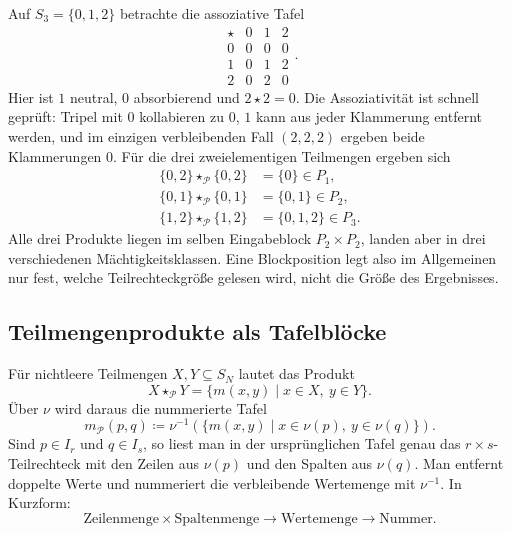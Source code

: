 \documentclass[main.tex]{subfiles}
\begin{document}
\begin{example}
Auf \(S_3=\{0,1,2\}\) betrachte die assoziative Tafel
\[
\begin{array}{c|ccc}
\star&0&1&2\\\hline
0&0&0&0\\
1&0&1&2\\
2&0&2&0
\end{array}.
\]
Hier ist \(1\) neutral, \(0\) absorbierend und \(2\star2=0\).  Die
Assoziativität ist schnell geprüft: Tripel mit \(0\) kollabieren zu \(0\),
\(1\) kann aus jeder Klammerung entfernt werden, und im einzigen verbleibenden
Fall \((2,2,2)\) ergeben beide Klammerungen \(0\).  Für die drei
zweielementigen Teilmengen ergeben sich
\[
\begin{aligned}
  \{0,2\}\star_{\mathcal P}\{0,2\}&=\{0\}\in P_1,\\
  \{0,1\}\star_{\mathcal P}\{0,1\}&=\{0,1\}\in P_2,\\
  \{1,2\}\star_{\mathcal P}\{1,2\}&=\{0,1,2\}\in P_3.
\end{aligned}
\]
Alle drei Produkte liegen im selben Eingabeblock \(P_2\times P_2\), landen
aber in drei verschiedenen Mächtigkeitsklassen.  Eine Blockposition legt
also im Allgemeinen nur fest, welche Teilrechteckgröße gelesen wird, nicht
die Größe des Ergebnisses.
\end{example}


\subsection{Teilmengenprodukte als Tafelblöcke}

Für nichtleere Teilmengen \(X,Y\subseteq S_N\) lautet das Produkt
\[
  X\star_{\mathcal P}Y
  =
  \{m(x,y)\mid x\in X,\ y\in Y\}.
\]
Über \(\nu\) wird daraus die nummerierte Tafel
\[
  \boxed{
  m_{\mathcal P}(p,q)
  \coloneqq
  \nu^{-1}\!\left(
    \{m(x,y)\mid x\in\nu(p),\ y\in\nu(q)\}
  \right).}
\]
Sind \(p\in I_r\) und \(q\in I_s\), so liest man in der ursprünglichen
Tafel genau das \(r\times s\)-Teilrechteck mit den Zeilen aus \(\nu(p)\) und
den Spalten aus \(\nu(q)\).  Man entfernt doppelte Werte und nummeriert die
verbleibende Wertemenge mit \(\nu^{-1}\).  In Kurzform:
\[
  \boxed{
  \text{Zeilenmenge}\times\text{Spaltenmenge}
  \longrightarrow
  \text{Wertemenge}
  \longrightarrow
  \text{Nummer}.}
\]
\end{document}
